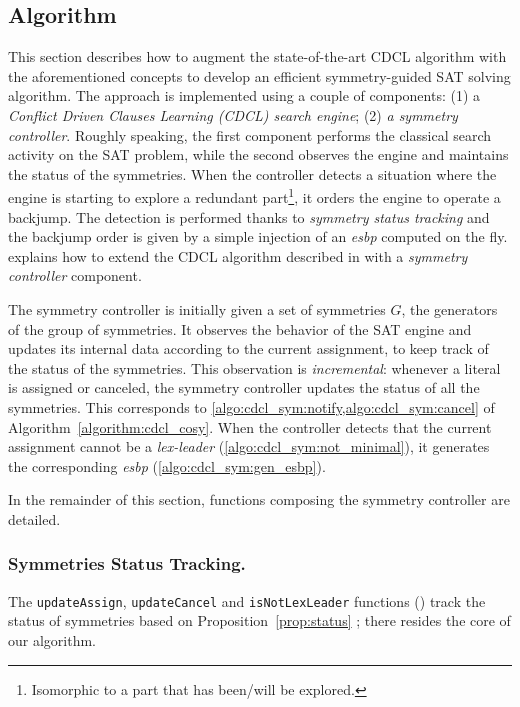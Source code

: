 \subsection{Algorithm}
This section describes how to augment the state-of-the-art CDCL algorithm with
the aforementioned concepts to develop an efficient symmetry-guided SAT
solving algorithm. 
The approach is implemented using a couple of components: (1) a
\textit{Conflict Driven Clauses Learning (CDCL) search engine}; (2) \textit{a symmetry controller}. Roughly speaking, the first component performs the
classical search activity on the SAT problem, while the second observes the
engine and maintains the status of the symmetries. When the controller detects
a situation where the engine is starting to explore a redundant
part\footnote{Isomorphic to a part that has been/will be explored.}, it orders
the engine to operate a backjump. The detection is performed thanks to
\emph{symmetry status tracking} and the backjump order is given by a simple
injection of an \emph{esbp} computed on the fly.
 explains how to extend the CDCL algorithm described in   with a \emph{symmetry controller} component.%

 
 The symmetry controller is initially given a set of symmetries $G$, the generators of the group of symmetries. It observes the behavior of the SAT engine and updates its internal data according to the current assignment, to keep track of the status of the symmetries. This observation is \emph{incremental}: whenever a literal is assigned or canceled, the symmetry controller updates the status of all the symmetries. This corresponds to \cref{algo:cdcl_sym:notify,algo:cdcl_sym:cancel} of Algorithm~\ref{algorithm:cdcl_cosy}. When the controller detects that the
 current assignment cannot be a \emph{lex-leader} (\cref{algo:cdcl_sym:not_minimal}), it generates the
 corresponding \emph{esbp} (\cref{algo:cdcl_sym:gen_esbp}).
 
 \medskip\noindent In the remainder of this section, functions
 composing the symmetry controller are detailed.
 
 \subsubsection{Symmetries Status Tracking.} The \texttt{updateAssign},
 \texttt{updateCancel} and \texttt{isNot\-LexLeader} functions () track the status of symmetries based on
 Proposition~\ref{prop:status} ; there resides the core of our algorithm.
 
